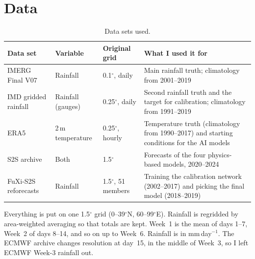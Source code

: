 \documentclass[11pt,a4paper]{article}
\begin{document}
\section{Data}
\label{app:data}
\begin{table}[H]
\centering\footnotesize
\caption{Data sets used.}
\label{tab:data}
\renewcommand{\arraystretch}{1.0}
\begin{tabularx}{\linewidth}{@{}l l l >{\raggedright\arraybackslash}X@{}}
\toprule
Data set & Variable & Original grid & What I used it for \\
\midrule
IMERG Final V07~\cite{huffman2023imerg} & Rainfall & 0.1$^\circ$, daily & Main rainfall truth; climatology from 2001--2019 \\
IMD gridded rainfall~\cite{pai2014imd} & Rainfall (gauges) & 0.25$^\circ$, daily & Second rainfall truth and the target for calibration;
climatology from 1991--2019 \\
ERA5~\cite{hersbach2020era5} & 2\,m temperature & 0.25$^\circ$, hourly & Temperature truth (climatology from 1990--2017) and
starting conditions for the AI models \\
S2S archive~\cite{vitart2017s2s} & Both & 1.5$^\circ$ & Forecasts of the four physics-based models, 2020--2024 \\
FuXi-S2S reforecasts & Rainfall & 1.5$^\circ$, 51 members & Training the calibration network (2002--2017) and picking
the final model (2018--2019) \\
\bottomrule
\end{tabularx}
\end{table}

Everything is put on one 1.5$^\circ$ grid (0--39$^\circ$N, 60--99$^\circ$E). Rainfall is regridded by area-weighted averaging so
that totals are kept. Week~1 is the mean of days 1--7, Week~2 of days 8--14, and so on up to Week~6. Rainfall is in
mm\,day$^{-1}$. The ECMWF archive changes resolution at day~15, in the middle of Week~3, so I left ECMWF Week-3 rainfall out.
\end{document}
